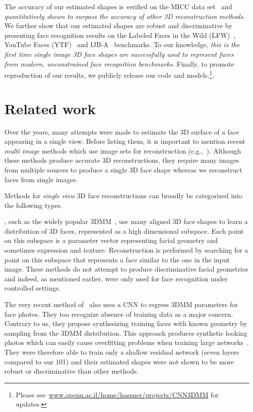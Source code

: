 \documentclass[10pt,twocolumn,letterpaper]{article}
\newcommand{\minisection}[1]{\vspace{1mm}\noindent{\bf #1}}
\begin{document}
The accuracy of our estimated shapes is verified on the MICC data set~\cite{bagdanov11micc} and {\em quantitatively shown to surpass the accuracy of other 3D reconstruction methods}. We further show that our estimated shapes are robust and discriminative by presenting face recognition results on the Labeled Faces in the Wild (LFW)~\cite{LFWTech}, YouTube Faces (YTF)~\cite{wolf:YTF} and IJB-A~\cite{Klare_2015_CVPR} benchmarks. To our knowledge, {\em this is the first time single image 3D face shapes are successfully used to represent faces from modern, unconstrained face recognition benchmarks}. Finally, to promote reproduction of our results, we publicly release our code and models.\footnote{Please see~\url{www.openu.ac.il/home/hassner/projects/CNN3DMM} for updates.}.


\section{Related work}\label{sec:related}
Over the years, many attempts were made to estimate the 3D surface of a face appearing in a single view. Before listing them, it is important to mention recent {\em multi image} methods which use image sets for reconstruction (e.g.,~\cite{liang2016head,Piotraschke_2016_CVPR,Roth_2015_CVPR,Roth_2016_CVPR,suwajanakorn2014total}). Although these methods produce accurate 3D reconstructions, they require many images from multiple sources to produce a single 3D face shape whereas we reconstruct faces from single images.

Methods for {\em single view} 3D face reconstructions can broadly be categorized into the following types. 

\minisection{Statistical shape representations}, such as the widely popular 3DMM~\cite{blanz2004exchanging,blanz1999morphable,chu2014,paysan09basel,romdhani2003efficient,tang2008real,yang2011expression}, use many aligned 3D face shapes to learn a  distribution of 3D faces, represented as a high dimensional subspace. Each point on this subspace is a parameter vector representing facial geometry and sometimes expression and texture. Reconstruction is performed by searching for a point on this subspace that represents a face similar to the one in the input image. These methods do not attempt to produce discriminative facial geometries and indeed, as mentioned earlier, were only used for face recognition under controlled settings.

The very recent method of~\cite{richardson20163d} also uses a CNN to regress 3DMM parameters for face photos. They too recognize absence of training data as a major concern. Contrary to us, they propose synthesizing training faces with known geometry by sampling from the 3DMM distribution. This approach produces synthetic looking photos which can easily cause overfitting problems when training large networks~\cite{masi16dowe}. They were therefore able to train only a shallow residual network (seven layers compared to our 101) and their estimated shapes were not shown to be more robust or discriminative than other methods. 
\end{document}
